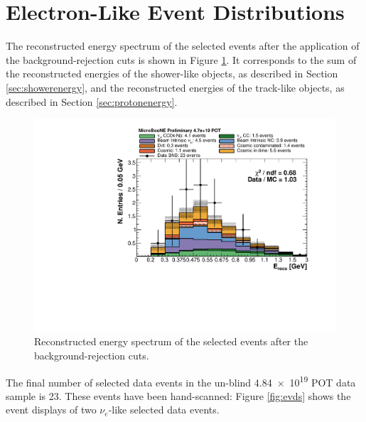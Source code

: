 
\section{Electron-Like Event Distributions}
The reconstructed energy spectrum of the selected events after the application of the background-rejection cuts is shown in Figure \ref{fig:spectrum_after}. It corresponds to the sum of the reconstructed energies of the shower-like objects, as described in Section \ref{sec:showerenergy}, and the reconstructed energies of the track-like objects, as described in Section \ref{sec:protonenergy}. 

\begin{figure}[htbp]
\centering
  \includegraphics[width=0.65\linewidth]{figures/h_fixed_energy_after.pdf}
    \caption{Reconstructed energy spectrum of the selected events after the background-rejection cuts.}\label{fig:spectrum_after}

\end{figure}


The final number of selected data events in the un-blind \num{4.84e19} POT data sample is 23. These events have been hand-scanned: Figure \ref{fig:evds} shows the event displays of two $\nu_{e}$-like selected data events.



